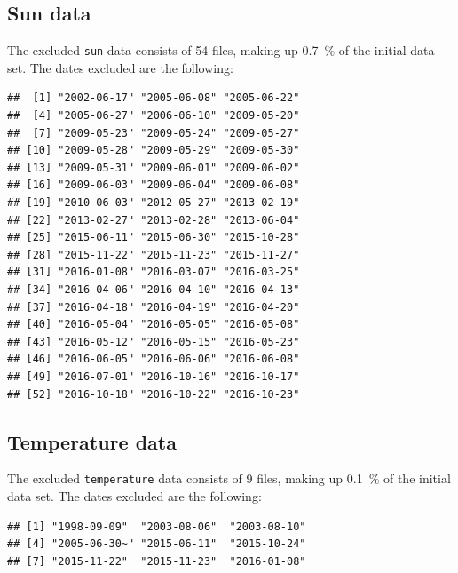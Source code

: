 \documentclass[10pt]{article}\usepackage[]{graphicx}\usepackage[]{color}
\makeatletter
\newenvironment{kframe}{%
 \def\at@end@of@kframe{}%
 \ifinner\ifhmode%
  \def\at@end@of@kframe{\end{minipage}}%
  \begin{minipage}{\columnwidth}%
 \fi\fi%
 \def\FrameCommand##1{\hskip\@totalleftmargin \hskip-\fboxsep
 \colorbox{shadecolor}{##1}\hskip-\fboxsep
     \hskip-\linewidth \hskip-\@totalleftmargin \hskip\columnwidth}%
 \MakeFramed {\advance\hsize-\width
   \@totalleftmargin\z@ \linewidth\hsize
   \@setminipage}}%
 {\par\unskip\endMakeFramed%
 \at@end@of@kframe}
\newenvironment{knitrout}{}{} %
\theoremstyle{plain}
\makeatother
\begin{document}
\subsection{Sun data}
The excluded \texttt{sun} data consists of 54 files, making up 0.7~\% of the initial data set. The dates excluded are the following:
\begin{knitrout}
\color{fgcolor}\begin{kframe}
\begin{verbatim}
##  [1] "2002-06-17" "2005-06-08" "2005-06-22"
##  [4] "2005-06-27" "2006-06-10" "2009-05-20"
##  [7] "2009-05-23" "2009-05-24" "2009-05-27"
## [10] "2009-05-28" "2009-05-29" "2009-05-30"
## [13] "2009-05-31" "2009-06-01" "2009-06-02"
## [16] "2009-06-03" "2009-06-04" "2009-06-08"
## [19] "2010-06-03" "2012-05-27" "2013-02-19"
## [22] "2013-02-27" "2013-02-28" "2013-06-04"
## [25] "2015-06-11" "2015-06-30" "2015-10-28"
## [28] "2015-11-22" "2015-11-23" "2015-11-27"
## [31] "2016-01-08" "2016-03-07" "2016-03-25"
## [34] "2016-04-06" "2016-04-10" "2016-04-13"
## [37] "2016-04-18" "2016-04-19" "2016-04-20"
## [40] "2016-05-04" "2016-05-05" "2016-05-08"
## [43] "2016-05-12" "2016-05-15" "2016-05-23"
## [46] "2016-06-05" "2016-06-06" "2016-06-08"
## [49] "2016-07-01" "2016-10-16" "2016-10-17"
## [52] "2016-10-18" "2016-10-22" "2016-10-23"
\end{verbatim}
\end{kframe}
\end{knitrout}

\subsection{Temperature data}
The excluded \texttt{temperature} data consists of 9 files, making up 0.1~\% of the initial data set. The dates excluded are the following:
\begin{knitrout}
\color{fgcolor}\begin{kframe}
\begin{verbatim}
## [1] "1998-09-09"  "2003-08-06"  "2003-08-10" 
## [4] "2005-06-30~" "2015-06-11"  "2015-10-24" 
## [7] "2015-11-22"  "2015-11-23"  "2016-01-08"
\end{verbatim}
\end{kframe}
\end{knitrout}
\end{document}
